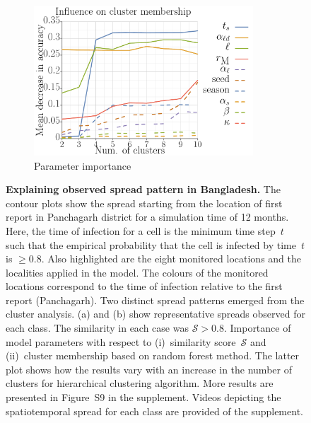 \documentclass[11pt]{article}
\newcommand{\similarity}{\mathcal{S}}
\theoremstyle{definition}
\begin{document}
\begin{figure}[t]
\begin{subfigure}[b]{.32\textwidth}
    \includegraphics[width=0.9\textwidth]{../../clustering/results/agglomerative/rf_k_agglomerative_mse.pdf}
    \caption{Parameter importance \label{fig:rf}}
\end{subfigure}
\caption{\textbf{Explaining observed spread pattern in Bangladesh.} The
contour plots show the spread starting from the location of first report in
Panchagarh district for a simulation time of 12 months.  Here, the time of
infection for a cell is the minimum time step~$t$ such that the empirical
probability that the cell is infected by time~$t$ is $\ge0.8$. Also
highlighted are the eight monitored locations and the localities applied in
the model. The colours of the monitored locations correspond to the time of
infection relative to the first report (Panchagarh). Two distinct spread
patterns emerged from the cluster analysis. (a) and (b) show representative
spreads observed for each class. The similarity in each case was
$\similarity>0.8$.  Importance of model parameters with respect to
(i)~similarity score~$\similarity$ and (ii)~cluster membership based on
random forest method. The latter plot shows how the results vary with an
increase in the number of clusters for hierarchical clustering algorithm.
More results are presented in Figure~S9 in the supplement.
Videos depicting the spatiotemporal spread for each class are provided of
the supplement.
}
\end{figure}
\end{document}
